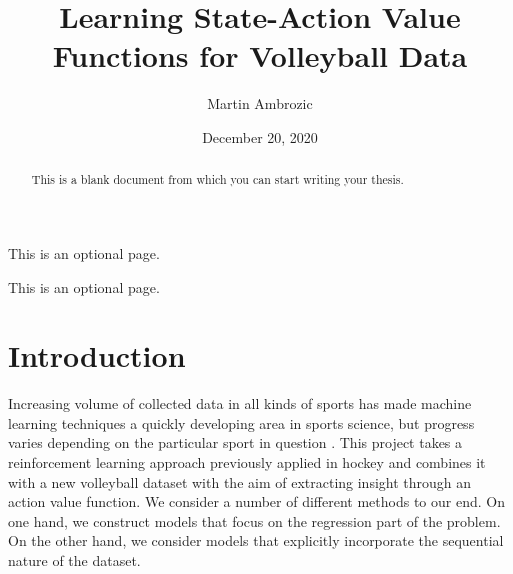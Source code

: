 \documentclass{sfuthesis}
\title{Learning State-Action Value Functions for Volleyball Data}
\author{Martin Ambrozic}
\date{December 20, 2020}
\begin{document}
	
	\frontmatter
	\maketitle{}
	\makecommittee{}
	
	\begin{abstract}
		This is a blank document from which you can start writing your thesis.
	\end{abstract}
	
	
	\begin{dedication}
		This is an optional page.
	\end{dedication}
	
	
	\begin{acknowledgements}
		This is an optional page.
	\end{acknowledgements}
	
	\tableofcontents%
	\clearpage
	
	\listoftables%
	\clearpage
	
	\listoffigures%
	\clearpage
	
	
	
	
	
	
	\mainmatter%
	
	
	\chapter{Introduction}
	
	Increasing volume of collected data in all kinds of sports has made machine learning techniques a quickly developing area in sports science, but progress varies depending on the particular sport in question \cite{claudino2019current}. This project takes a reinforcement learning approach previously applied in hockey \cite{liu2018deep, routley2015markov,schulte2017markov} and combines it with a new volleyball dataset with the aim of extracting insight through an action value function. We consider a number of different methods to our end. On one hand, we construct models that focus on the regression part of the problem. On the other hand, we consider models that explicitly incorporate the sequential nature of the dataset.
	
\end{document}
